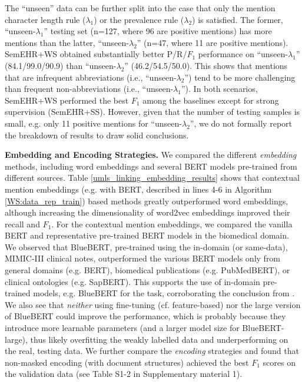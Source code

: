 \documentclass[twocolumn]{bmcart}
\begin{document}
The ``unseen'' data can be further split into the case that only the mention character length rule ($\lambda_1$) or the prevalence rule ($\lambda_2$) is satisfied. The former, ``unseen-$\lambda_1$'' testing set (n=127, where 96 are positive mentions) has more mentions than the latter, ``unseen-$\lambda_2$'' (n=47, where 11 are positive mentions). SemEHR+WS obtained substantially better P/R/$F_1$ performance on ``unseen-$\lambda_1$'' (84.1/99.0/90.9) than ``unseen-$\lambda_2$'' (46.2/54.5/50.0). This shows that mentions that are infrequent abbreviations (i.e., ``unseen-$\lambda_2$'') tend to be more challenging than frequent non-abbreviations (i.e., ``unseen-$\lambda_1$''). In both scenarios, SemEHR+WS performed the best $F_1$ among the baselines except for strong supervision (SemEHR+SS). However, given that the number of testing samples is small, e.g. only 11 positive mentions for ``unseen-$\lambda_2$'', we do not formally report the breakdown of results to draw solid conclusions.

\textbf{Embedding and Encoding Strategies.} We compared the different \emph{embedding} methods, including word embeddings and several BERT models pre-trained from different sources. Table \ref{umls_linking_embedding_results} shows that contextual mention embeddings (e.g. with BERT, described in lines 4-6 in Algorithm \ref{WS:data_rep_train}) based methods greatly outperformed word embeddings, although increasing the dimensionality of word2vec embeddings improved their recall and $F_1$. For the contextual mention embeddings, we compared the vanilla BERT and representative pre-trained BERT models in the biomedical domain. We observed that BlueBERT, pre-trained using the in-domain (or same-data), MIMIC-III clinical notes, outperformed the various BERT models only from general domains (e.g. BERT), biomedical publications (e.g. PubMedBERT), or clinical ontologies (e.g. SapBERT). This supports the use of in-domain pre-trained models, e.g. BlueBERT for the task, corroborating the conclusion from \cite{gururangan2020}. We also see that \textit{neither} using fine-tuning (cf. feature-based) nor the large version of BlueBERT could improve the performance, which is probably because they introduce more learnable parameters (and a larger model size for BlueBERT-large), thus likely overfitting the weakly labelled data and underperforming on the real, testing data. We further compare the \emph{encoding} strategies and found that non-masked encoding (with document structures) achieved the best $F_1$ scores on the validation data (see Table S1-2 in Supplementary material 1).
\end{document}
